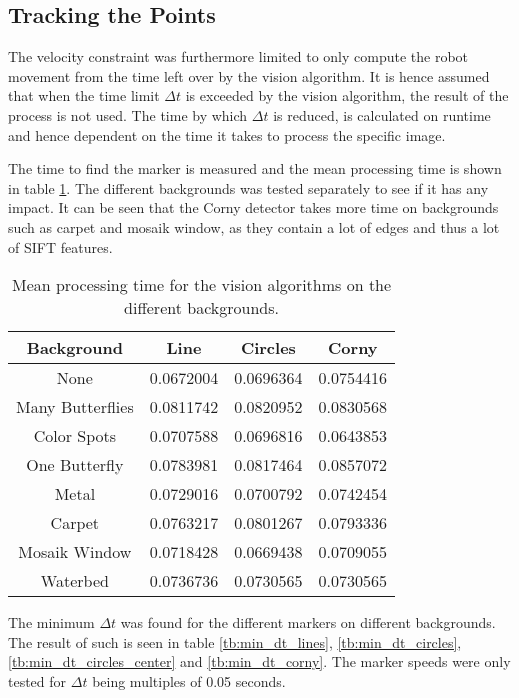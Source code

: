 \subsection{Tracking the Points}
The velocity constraint was furthermore limited to only compute the robot movement from the time left over by the vision algorithm.
It is hence assumed that when the time limit $\Delta t$ is exceeded by the vision algorithm, the result of the process is not used.
The time by which $\Delta t$ is reduced, is calculated on runtime and hence dependent on the time it takes to process the specific image.

The time to find the marker is measured and the mean processing time is shown in table \ref{tb:mean_processing_time}.
The different backgrounds was tested separately to see if it has any impact.
It can be seen that the Corny detector takes more time on backgrounds such as carpet and mosaik window, as they contain a lot of edges and thus a lot of SIFT features.

\begin{table}[H]
\center
\begin{tabular}{|c|c|c|c|}
\hline
Background       & Line      & Circles   & Corny     \\ \hline
None             & 0.0672004 & 0.0696364 & 0.0754416 \\ \hline
Many Butterflies & 0.0811742 & 0.0820952 & 0.0830568 \\ \hline
Color Spots      & 0.0707588 & 0.0696816 & 0.0643853 \\ \hline
One Butterfly    & 0.0783981 & 0.0817464 & 0.0857072 \\ \hline
Metal            & 0.0729016 & 0.0700792 & 0.0742454 \\ \hline
Carpet           & 0.0763217 & 0.0801267 & 0.0793336 \\ \hline
Mosaik Window    & 0.0718428 & 0.0669438 & 0.0709055 \\ \hline
Waterbed         & 0.0736736 & 0.0730565 & 0.0730565 \\ \hline
\end{tabular}
\caption{Mean processing time for the vision algorithms on the different backgrounds.}
\label{tb:mean_processing_time}
\end{table}

The minimum $\Delta t$ was found for the different markers on different backgrounds.
The result of such is seen in table \ref{tb:min_dt_lines}, \ref{tb:min_dt_circles}, \ref{tb:min_dt_circles_center} and \ref{tb:min_dt_corny}.
The marker speeds were only tested for $\Delta t$ being multiples of 0.05 seconds.

